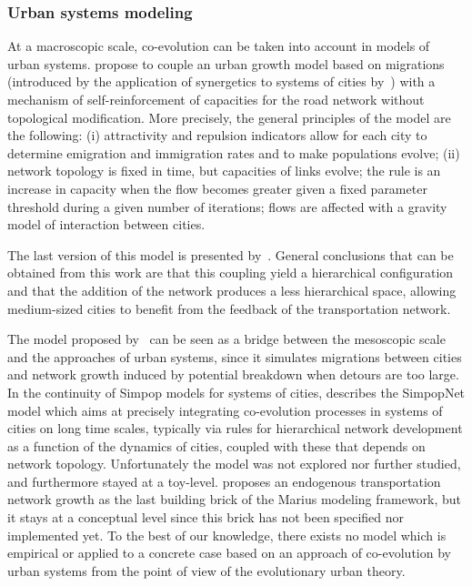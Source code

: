 \documentclass[10pt]{article}
\begin{document}
\subsubsection{Urban systems modeling}

At a macroscopic scale, co-evolution can be taken into account in models of urban systems. \cite{baptiste1999interactions} propose to couple an urban growth model based on migrations (introduced by the application of synergetics to systems of cities by~\cite{sanders1992systeme}) with a mechanism of self-reinforcement of capacities for the road network without topological modification. More precisely, the general principles of the model are the following: (i) attractivity and repulsion indicators allow for each city to determine emigration and immigration rates and to make populations evolve; (ii) network topology is fixed in time, but capacities of links evolve; the rule is an increase in capacity when the flow becomes greater given a fixed parameter threshold during a given number of iterations; flows are affected with a gravity model of interaction between cities.


The last version of this model is presented by~\cite{baptistemodeling}. General conclusions that can be obtained from this work are that this coupling yield a hierarchical configuration and that the addition of the network produces a less hierarchical space, allowing medium-sized cities to benefit from the feedback of the transportation network.


The model proposed by~\cite{blumenfeld2010network} can be seen as a bridge between the mesoscopic scale and the approaches of urban systems, since it simulates migrations between cities and network growth induced by potential breakdown when detours are too large. In the continuity of Simpop models for systems of cities, \cite{schmitt2014modelisation} describes the SimpopNet model which aims at precisely integrating co-evolution processes in systems of cities on long time scales, typically via rules for hierarchical network development as a function of the dynamics of cities, coupled with these that depends on network topology. Unfortunately the model was not explored nor further studied, and furthermore stayed at a toy-level. \cite{cottineau2014evolution} proposes an endogenous transportation network growth as the last building brick of the Marius modeling framework, but it stays at a conceptual level since this brick has not been specified nor implemented yet. To the best of our knowledge, there exists no model which is empirical or applied to a concrete case based on an approach of co-evolution by urban systems from the point of view of the evolutionary urban theory.
\end{document}
